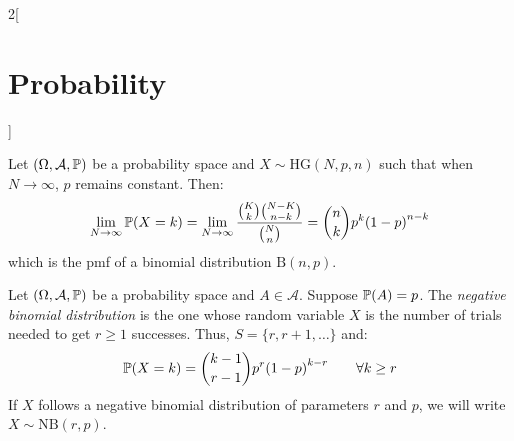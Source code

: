 \documentclass[../../../main.tex]{subfiles}
\begin{document}
\begin{multicols}{2}[\section{Probability}]
\begin{definition}
    \end{definition}
    \begin{theorem}
        Let $(\Omega,\mathcal{A},\mathbb{P})$ be a probability space and $X\sim \text{HG}(N,p,n)$ such that when $N\to\infty$, $p$ remains constant. Then:
        $$\lim_{N\to\infty}\mathbb{P}(X=k)=\lim_{N\to\infty}\frac{\binom{K}{k}\binom{N-K}{n-k}}{\binom{N}{n}}=\binom{n}{k}p^k{(1-p)}^{n-k}$$ which is the pmf of a binomial distribution $\text{B}(n,p)$.
    \end{theorem}
    \begin{definition}
        Let $(\Omega,\mathcal{A},\mathbb{P})$ be a probability space and $A\in\mathcal{A}$. Suppose $\mathbb{P}(A)=p$. The \textit{negative binomial distribution} is the one whose random variable $X$ is the number of trials needed to get $r\geq 1$ successes. Thus, $S=\{r,r+1,\ldots\}$ and: $$\mathbb{P}(X=k)=\binom{k-1}{r-1}p^r{(1-p)}^{k-r}\qquad \forall k\geq r$$ If $X$ follows a negative binomial distribution of parameters $r$ and $p$, we will write $X\sim \text{NB}(r,p)$.
    \end{definition}

\end{multicols}
\end{document}
